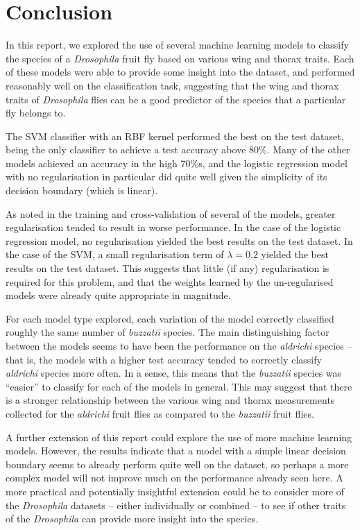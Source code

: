 \section{Conclusion}

In this report, we explored the use of several machine learning models to classify the species of a \textit{Drosophila} fruit fly based on various wing and thorax traits. Each of these models were able to provide some insight into the dataset, and performed reasonably well on the classification task, suggesting that the wing and thorax traits of \textit{Drosophila} flies can be a good predictor of the species that a particular fly belongs to.

The SVM classifier with an RBF kernel performed the best on the test dataset, being the only classifier to achieve a test accuracy above 80\%. Many of the other models achieved an accuracy in the high 70\%s, and the logistic regression model with no regularisation in particular did quite well given the simplicity of its decision boundary (which is linear).

As noted in the training and cross-validation of several of the models, greater regularisation tended to result in worse performance. In the case of the logistic regression model, no regularisation yielded the best results on the test dataset. In the case of the SVM, a small regularisation term of $\lambda = 0.2$ yielded the best results on the test dataset. This suggests that little (if any) regularisation is required for this problem, and that the weights learned by the un-regularised models were already quite appropriate in magnitude.

For each model type explored, each variation of the model correctly classified roughly the same number of \textit{buzzatii} species. The main distinguishing factor between the models seems to have been the performance on the \textit{aldrichi} species -- that is, the models with a higher test accuracy tended to correctly classify \textit{aldrichi} species more often. In a sense, this means that the \textit{buzzatii} species was ``easier'' to classify for each of the models in general. This may suggest that there is a stronger relationship between the various wing and thorax measurements collected for the \textit{aldrichi} fruit flies as compared to the \textit{buzzatii} fruit flies.

A further extension of this report could explore the use of more machine learning models. However, the results indicate that a model with a simple linear decision boundary seems to already perform quite well on the dataset, so perhaps a more complex model will not improve much on the performance already seen here. A more practical and potentially insightful extension could be to consider more of the \textit{Drosophila} datasets \parencite{datasetcollections} -- either individually or combined -- to see if other traits of the \textit{Drosophila} can provide more insight into the species.

\clearpage
\printbibliography



